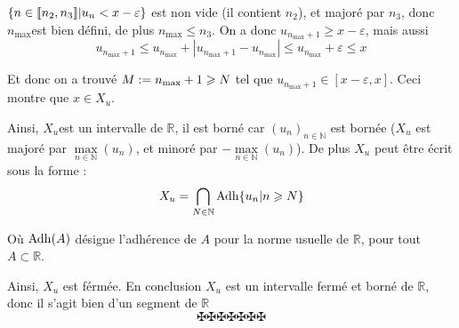 $\{ n \in \llbracket n_2, n_3 \rrbracket  |  u_n < x - \varepsilon
\}$ est non vide (il contient $n_2$), et major{\'e} par $n_3$, donc $n_{\max}
$est bien d{\'e}fini, de plus $n_{\max} \leqslant n_3$. On a donc $u_{n_{\max}
+ 1} \geqslant x - \varepsilon$, mais aussi
\[ u_{n_{\max} + 1} \leqslant u_{n_{\max}} + | u_{n_{\max} + 1} - u_{n_{\max}}
   | \leqslant u_{n_{\max}} + \varepsilon \leqslant x \]


Et donc on a trouv{\'e} $M := n_{\max} + 1 \geqslant N$ tel que
$u_{n_{\max} + 1} \in [x - \varepsilon, x]$. Ceci montre que $x \in X_u$.

Ainsi, $X_u$est un intervalle de $\mathbb{R}$, il est born{\'e} car $(u_n)_{n
\in \mathbb{N}}$ est born{\'e}e ($X_u$ est major{\'e} par $\underset{n \in
\mathbb{N}}{\max} (u_n)$, et minor{\'e} par $- \underset{n \in
\mathbb{N}}{\max} (u_n)$). De plus $X_u$ peut {\^e}tre {\'e}crit sous la forme
:
\[ X_u = \underset{N \in \mathbb{N}}{\bigcap} \operatorname{Adh} \{ u_n | n \geqslant
   N  \} \]


O{\`u} $\operatorname{Adh} (A)$ d{\'e}signe l'adh{\'e}rence de $A$ pour la norme
usuelle de $\mathbb{R}$, pour tout $A \subset \mathbb{R}$.

Ainsi, $X_u$ est f{\'e}rm{\'e}e. En conclusion $X_u$ est un intervalle
ferm{\'e} et born{\'e} de $\mathbb{R}$, donc il s'agit bien d'un segment de
$\mathbb{R}$
\[ \maltese \maltese \maltese \maltese \maltese \maltese \maltese \]
